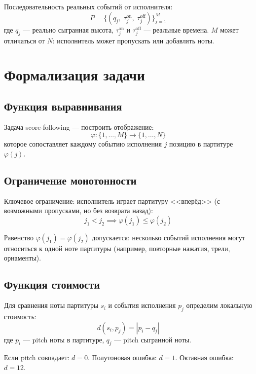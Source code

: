 \documentclass[a4paper,11pt]{article}
\begin{document}
\begin{defbox}[title={Исполнение (Performance)}]
Последовательность реальных событий от исполнителя:
\[
  P = \bigl\{(q_j,\; \tau_j^{\mathrm{on}},\; \tau_j^{\mathrm{off}})\bigr\}_{j=1}^{M}
\]
где $q_j$ --- реально сыгранная высота, $\tau_j^{\mathrm{on}}$ и $\tau_j^{\mathrm{off}}$
--- реальные времена. $M$ может отличаться от $N$: исполнитель может пропускать
или добавлять ноты.
\end{defbox}


\section{Формализация задачи}
\label{sec:formalization}

\subsection{Функция выравнивания}

\begin{formulabox}[title={Функция выравнивания}]
Задача score-following --- построить отображение:
\[
  \varphi: \{1, \ldots, M\} \longrightarrow \{1, \ldots, N\}
\]
которое сопоставляет каждому событию исполнения $j$ позицию
в партитуре $\varphi(j)$.
\end{formulabox}

\subsection{Ограничение монотонности}

Ключевое ограничение: исполнитель играет партитуру <<вперёд>>
(с возможными пропусками, но без возврата назад):
\[
  j_1 < j_2 \implies \varphi(j_1) \leq \varphi(j_2)
\]

Равенство $\varphi(j_1) = \varphi(j_2)$ допускается: несколько
событий исполнения могут относиться к одной ноте партитуры
(например, повторные нажатия, трели, орнаменты).

\subsection{Функция стоимости}

\begin{formulabox}[title={Функция стоимости (cost function)}]
Для сравнения ноты партитуры $s_i$ и события исполнения $p_j$
определим локальную стоимость:
\[
  d(s_i, p_j) = |p_i - q_j|
\]
где $p_i$ --- pitch ноты в партитуре, $q_j$ --- pitch сыгранной ноты.

Если pitch совпадает: $d = 0$. Полутоновая ошибка: $d = 1$.
Октавная ошибка: $d = 12$.
\end{formulabox}
\end{document}
